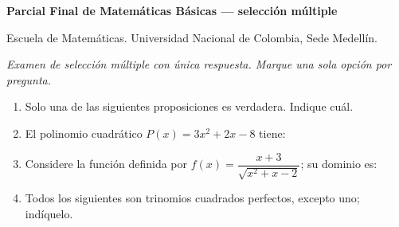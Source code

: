 \documentclass[11pt]{article}
\begin{document}
{\large\bfseries Parcial Final de Matemáticas Básicas --- selección múltiple}

\medskip
\noindent Escuela de Matemáticas. Universidad Nacional de Colombia, Sede Medellín.

\medskip
\noindent\textit{Examen de selección múltiple con única respuesta. Marque una sola opción por pregunta.}

\begin{enumerate}
\item Solo una de las siguientes proposiciones es verdadera. Indique cuál.

\item El polinomio cuadrático $P(x) = 3x^2 + 2x - 8$ tiene:

\item Considere la función definida por $f(x) = \dfrac{x + 3}{\sqrt{x^2 + x - 2}}$; su dominio es:

\item Todos los siguientes son trinomios cuadrados perfectos, excepto uno; indíquelo.


\end{enumerate}
\end{document}

